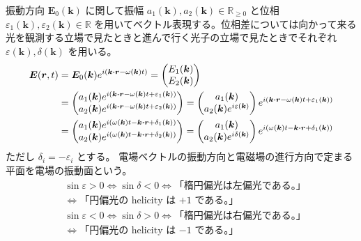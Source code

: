 \documentclass[uplatex,dvipdfmx,a4paper,11pt]{jlreq}
\newcommand{\RR}{\mathbb{R}}
\newcommand{\EE}{\bm{E}}
\newcommand{\rr}{\bm{r}}
\newcommand{\kk}{\bm{k}}
\theoremstyle{definition}
\begin{document}
\begin{definition}[偏光]
  振動方向 $\EE_0(\kk)$ に関して振幅 $a_1(\kk), a_2(\kk)\in\RR_{\geq 0}$ と位相 $\varepsilon_1(\kk), \varepsilon_2(\kk)\in\RR$ を用いてベクトル表現する。位相差については向かって来る光を観測する立場で見たときと進んで行く光子の立場で見たときでそれぞれ $\varepsilon(\kk), \delta(\kk)$ を用いる。
  \begin{align}
    \EE(\rr, t) & = \EE_0(\kk)e^{i(\kk\vdot\rr - \omega(\kk)t)}
    = \begin{pmatrix}
        E_1(\kk) \\
        E_2(\kk)
      \end{pmatrix}                                                                                \\
                & = \begin{pmatrix}
                      a_1(\kk)e^{i(\kk\vdot\rr - \omega(\kk)t + \varepsilon_1(\kk))} \\
                      a_2(\kk)e^{i(\kk\vdot\rr - \omega(\kk)t + \varepsilon_2(\kk))}
                    \end{pmatrix}
    =
    \begin{pmatrix}
      a_1(\kk) \\
      a_2(\kk)e^{i\varepsilon(\kk)}
    \end{pmatrix}e^{i(\kk\vdot\rr - \omega(\kk)t + \varepsilon_1(\kk))}                             \\
                & =
    \begin{pmatrix}
      a_1(\kk)e^{i(\omega(\kk)t - \kk\vdot\rr + \delta_1(\kk))} \\
      a_2(\kk)e^{i(\omega(\kk)t - \kk\vdot\rr + \delta_2(\kk))}
    \end{pmatrix}
    =
    \begin{pmatrix}
      a_1(\kk) \\
      a_2(\kk)e^{i\delta(\kk)}
    \end{pmatrix}e^{i(\omega(\kk)t - \kk\vdot\rr + \delta_1(\kk))}
  \end{align}
  ただし $\delta_i = - \varepsilon_i$ とする。
  電場ベクトルの振動方向と電磁場の進行方向で定まる平面を電場の振動面という。
  \begin{align}
     & \sin\varepsilon > 0 \iff \sin\delta < 0 \iff \text{「楕円偏光は左偏光である。」} \\
     & \iff \text{「円偏光の helicity は $+1$ である。」}                            \\
     & \sin\varepsilon < 0 \iff \sin\delta > 0 \iff \text{「楕円偏光は右偏光である。」} \\
     & \iff \text{「円偏光の helicity は $-1$ である。」}
  \end{align}
\end{definition}
\end{document}
